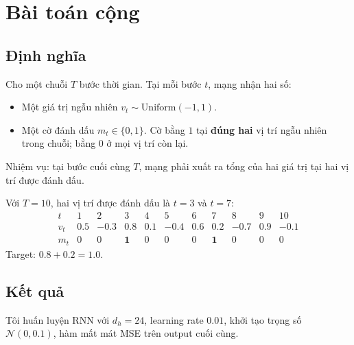 %

\section{Bài toán cộng}
\label{sec:ch02-adding}

%

\subsection{Định nghĩa}

Cho một chuỗi $T$ bước thời gian. Tại mỗi bước $t$, mạng nhận hai số:
\begin{itemize}
  \item Một giá trị ngẫu nhiên $v_t \sim \mathrm{Uniform}(-1, 1)$.
  \item Một cờ đánh dấu $m_t \in \{0, 1\}$. Cờ bằng $1$ tại \textbf{đúng hai}
    vị trí ngẫu nhiên trong chuỗi; bằng $0$ ở mọi vị trí còn lại.
\end{itemize}

Nhiệm vụ: tại bước cuối cùng $T$, mạng phải xuất ra tổng của hai giá trị tại
hai vị trí được đánh dấu.

\begin{example}
Với $T=10$, hai vị trí được đánh dấu là $t=3$ và $t=7$:
\[
\begin{array}{c|cccccccccc}
t      & 1 & 2 & 3    & 4 & 5 & 6 & 7    & 8 & 9 & 10 \\
\hline
v_t    & 0.5 & -0.3 & \mathbf{0.8} & 0.1 & -0.4 & 0.6 & \mathbf{0.2} & -0.7 & 0.9 & -0.1 \\
m_t    & 0 & 0 & \mathbf{1} & 0 & 0 & 0 & \mathbf{1} & 0 & 0 & 0
\end{array}
\]
Target: $0.8 + 0.2 = 1.0$.
\end{example}

\subsection{Kết quả}

Tôi huấn luyện RNN với $d_h = 24$, learning rate $0.01$, khởi tạo trọng số
$\mathcal{N}(0, 0.1)$, hàm mất mát MSE trên output cuối cùng.


